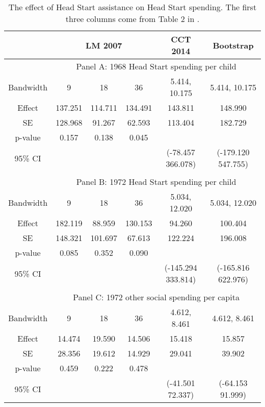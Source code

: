 \documentclass[12pt,fleqn]{article}
\begin{document}
\begin{table}[ht]
	\centering
	\begin{tabular}{cccccc}
		\toprule
		& \multicolumn{3}{c}{LM 2007} & CCT 2014 & Bootstrap \\
		\midrule
		& \multicolumn{5}{c}{Panel A: 1968 Head Start spending per child} \\ 
		Bandwidth & 9 & 18 & 36 & 5.414, 10.175 & 5.414, 10.175 \\
		Effect    & 137.251 & 114.711 & 134.491 & 143.811 & 148.990 \\
		SE        & 128.968 & 91.267  & 62.593 & 113.404 & 182.729 \\
		p-value   & 0.157   & 0.138   & 0.045  & & \\
		95\% CI   & & & & (-78.457 366.078) & (-179.120  547.755) \\
		
		&&&&& \\
		& \multicolumn{5}{c}{Panel B: 1972 Head Start spending per child} \\ 
		Bandwidth & 9 & 18 & 36 & 5.034, 12.020 & 5.034, 12.020 \\
		Effect    & 182.119 & 88.959 & 130.153 & 94.260 & 100.404 \\
		SE        & 148.321 & 101.697 & 67.613 & 122.224 & 196.008 \\
		p-value   & 0.085   & 0.352   & 0.090  & & \\
		95\% CI   & & & & (-145.294 333.814) & (-165.816 622.976) \\
		
		&&&&& \\
		& \multicolumn{5}{c}{Panel C: 1972 other social spending per capita} \\ 
		Bandwidth & 9 & 18 & 36 & 4.612, 8.461 & 4.612, 8.461 \\
		Effect    & 14.474 & 19.590 & 14.506 & 15.418 & 15.857 \\
		SE        & 28.356 & 19.612 & 14.929 & 29.041 & 39.902 \\
		p-value   & 0.459   & 0.222   & 0.478  & & \\
		95\% CI   & & & & (-41.501 72.337) & (-64.153 91.999) \\
		\bottomrule
	\end{tabular}
	\caption{The effect of Head Start assistance on Head Start spending. The first three columns come from Table 2 in \cite{ludwig2007}.}
	\label{tab: head start spending}
\end{table}
\end{document}
